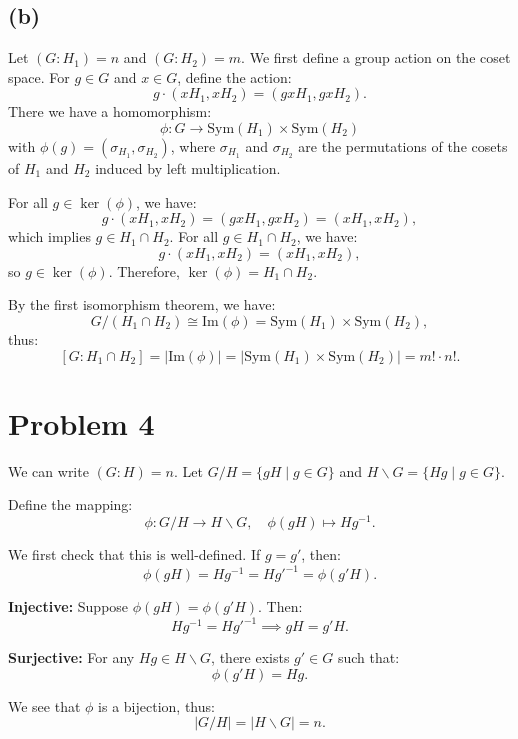\documentclass{article}
\begin{document}
\subsection*{(b)}
Let \( (G : H_1) = n \) and \( (G : H_2) = m \). We first define a group action on the coset space. For \( g \in G \) and \( x \in G \), define the action:
\[
g \cdot (xH_1, xH_2) = (gxH_1, gxH_2).
\]
There we have a homomorphism:
\[
\phi : G \to \text{Sym}(H_1) \times \text{Sym}(H_2)
\]
with \(\phi(g) = (\sigma_{H_1}, \sigma_{H_2})\), where \(\sigma_{H_1}\) and \(\sigma_{H_2}\) are the permutations of the cosets of \( H_1 \) and \( H_2 \) induced by left multiplication.

For all \( g \in \ker(\phi) \), we have:
\[
g \cdot (xH_1, xH_2) = (gxH_1, gxH_2) = (xH_1, xH_2),
\]
which implies \( g \in H_1 \cap H_2 \). For all \( g \in H_1 \cap H_2 \), we have:
\[
g \cdot (xH_1, xH_2) = (xH_1, xH_2),
\]
so \( g \in \ker(\phi) \). Therefore, \( \ker(\phi) = H_1 \cap H_2 \).

By the first isomorphism theorem, we have:
\[
G / (H_1 \cap H_2) \cong \text{Im}(\phi) = \text{Sym}(H_1) \times \text{Sym}(H_2),
\]
thus:
\[
[G : H_1 \cap H_2] = |\text{Im}(\phi)| = |\text{Sym}(H_1) \times \text{Sym}(H_2)| = m! \cdot n!.
\]

\section*{Problem 4}

We can write \( (G : H) = n \). Let \( G/H = \{gH \mid g \in G\} \) and \( H \backslash G = \{Hg \mid g \in G\} \).

Define the mapping:
\[
\phi: G/H \to H \backslash G, \quad \phi(gH) \mapsto Hg^{-1}.
\]

We first check that this is well-defined. If \( g = g' \), then:
\[
\phi(gH) = Hg^{-1} = H{g'}^{-1} = \phi(g'H).
\]

\textbf{Injective:} Suppose \(\phi(gH) = \phi(g'H)\). Then:
\[
Hg^{-1} = H{g'}^{-1} \implies gH = g'H.
\]

\textbf{Surjective:} For any \( Hg \in H \backslash G \), there exists \( g' \in G \) such that:
\[
\phi(g'H) = Hg.
\]

We see that \(\phi\) is a bijection, thus:
\[
|G/H| = |H \backslash G| = n.
\]
\end{document}
